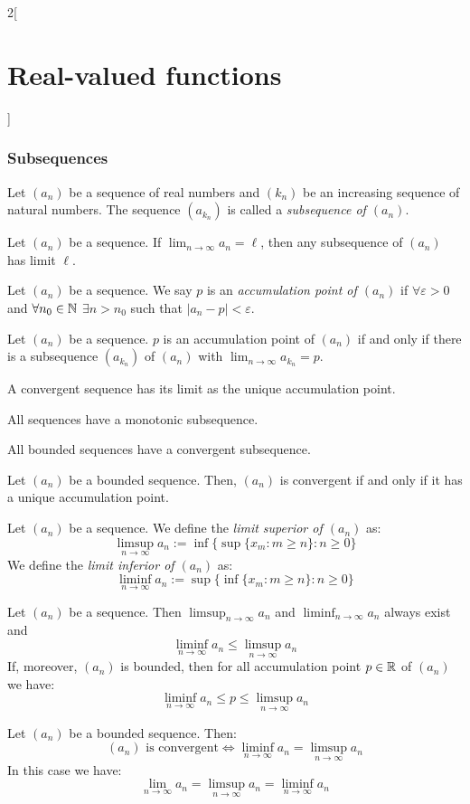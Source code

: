 \documentclass[../../../main.tex]{subfiles}
\begin{document}
\begin{multicols}{2}[\section{Real-valued functions}]
\subsubsection*{Subsequences}
\begin{definition}[Subsequence]
    Let $(a_n)$ be a sequence of real numbers and $(k_n)$ be an increasing sequence of natural numbers. The sequence $(a_{k_n})$ is called a \textit{subsequence of $(a_n)$}.
\end{definition}
\begin{lemma}
    Let $(a_n)$ be a sequence. If $\displaystyle\lim_{n\to\infty} a_n=\ell$, then any subsequence of $(a_n)$ has limit $\ell$. 
\end{lemma}
\begin{definition}
    Let $(a_n)$ be a sequence. We say $p$ is an \textit{accumulation point of $(a_n)$} if $\forall\varepsilon>0$ and $\forall n_0\in\mathbb{N}$ $\exists n>n_0$ such that $|a_n-p|<\varepsilon$.
\end{definition}
\begin{prop}
    Let $(a_n)$ be a sequence. $p$ is an accumulation point of $(a_n)$ if and only if there is a subsequence $(a_{k_n})$ of $(a_n)$ with $\displaystyle\lim_{n\to\infty}a_{k_n}=p$.
\end{prop}
\begin{corollary}
    A convergent sequence has its limit as the unique accumulation point.
\end{corollary}
\begin{prop}
    All sequences have a monotonic subsequence.
\end{prop}
\begin{theorem}
    All bounded sequences have a convergent subsequence.
\end{theorem}
\begin{prop}
    Let $(a_n)$ be a bounded sequence. Then, $(a_n)$ is convergent if and only if it has a unique accumulation point.
\end{prop}
\begin{definition}
    Let $(a_n)$ be a sequence. We define the \textit{limit superior of $(a_n)$} as:
    $$\limsup_{n\to\infty}a_n:=\inf\{\sup\{x_m:m\geq n\}:n\geq 0\}$$
    We define the \textit{limit inferior of $(a_n)$} as:
    $$\liminf_{n\to\infty}a_n:=\sup\{\inf\{x_m:m\geq n\}:n\geq 0\}$$
\end{definition}
\begin{prop}
    Let $(a_n)$ be a sequence. Then $\displaystyle\limsup_{n\to\infty}a_n$ and $\displaystyle\liminf_{n\to\infty}a_n$ always exist and $$\liminf_{n\to\infty}a_n\leq\limsup_{n\to\infty}a_n$$
    If, moreover, $(a_n)$ is bounded, then for all accumulation point $p\in\mathbb{R}$ of $(a_n)$ we have:
    $$\liminf_{n\to\infty}a_n\leq p\leq\limsup_{n\to\infty}a_n$$
\end{prop}
\begin{prop}
    Let $(a_n)$ be a bounded sequence. Then: $$(a_n)\text{ is convergent}\iff \liminf_{n\to\infty} a_n=\limsup_{n\to\infty} a_n$$ In this case we have: $$\lim_{n\to\infty} a_n=\limsup_{n\to\infty} a_n=\liminf_{n\to\infty} a_n$$
\end{prop}

\end{multicols}
\end{document}
